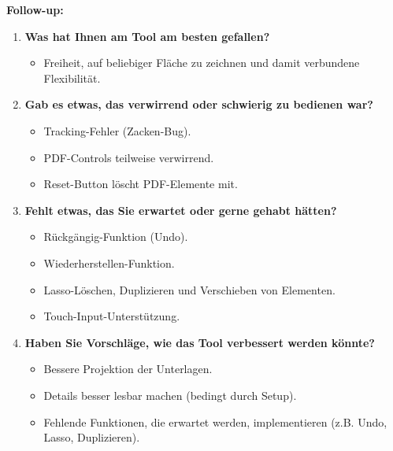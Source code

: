 \textbf{Follow-up:}  
\begin{enumerate}
    \item \textbf{Was hat Ihnen am Tool am besten gefallen?}
    \begin{itemize}
        \item Freiheit, auf beliebiger Fläche zu zeichnen und damit verbundene Flexibilität.
    \end{itemize}

    \item \textbf{Gab es etwas, das verwirrend oder schwierig zu bedienen war?}
    \begin{itemize}
        \item Tracking-Fehler (Zacken-Bug).
        \item PDF-Controls teilweise verwirrend.
        \item Reset-Button löscht PDF-Elemente mit.
    \end{itemize}

    \item \textbf{Fehlt etwas, das Sie erwartet oder gerne gehabt hätten?}
    \begin{itemize}
        \item Rückgängig-Funktion (Undo).
        \item Wiederherstellen-Funktion.
        \item Lasso-Löschen, Duplizieren und Verschieben von Elementen.
        \item Touch-Input-Unterstützung.
    \end{itemize}

    \item \textbf{Haben Sie Vorschläge, wie das Tool verbessert werden könnte?}
    \begin{itemize}
        \item Bessere Projektion der Unterlagen.
        \item Details besser lesbar machen (bedingt durch Setup).
        \item Fehlende Funktionen, die erwartet werden, implementieren (z.B. Undo, Lasso, Duplizieren).
    \end{itemize}
\end{enumerate}

\clearpage